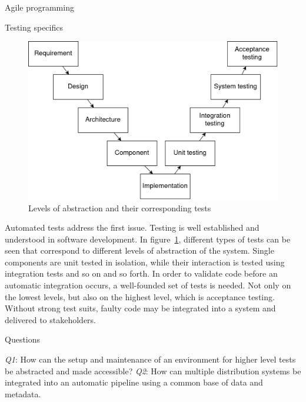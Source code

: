 Agile programming

Testing specifics

\begin{figure}[H]
    \centering
    \includegraphics[width=0.5\textheight]{img/introduction/software-testing-v.drawio}
    \caption{Levels of abstraction and their corresponding tests}
    \label{fig:levels-of-abstraction-and-tests}
\end{figure}

Automated tests address the first issue.
Testing is well established and understood in software development.
In figure~\ref{fig:levels-of-abstraction-and-tests}, different types of tests can be seen that correspond to different levels of abstraction of the system.
Single components are unit tested in isolation, while their interaction is tested using integration tests and so on and so forth.
In order to validate code before an automatic integration occurs, a well-founded set of tests is needed.
Not only on the lowest levels, but also on the highest level, which is acceptance testing.
Without strong test suits,  faulty code may be integrated into a system and delivered to stakeholders.

Questions

\textit{Q1}: How can the setup and maintenance of an environment for higher level tests be abstracted and made accessible?
\textit{Q2}: How can multiple distribution systems be integrated into an automatic pipeline using a common base of data and metadata.